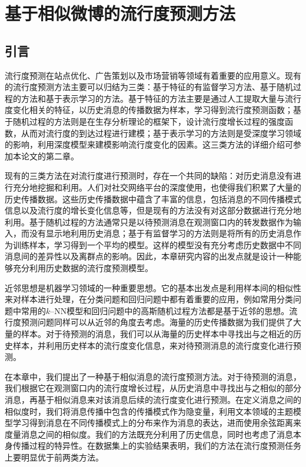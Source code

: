 \chapter{基于相似微博的流行度预测方法}
\label{chap:three}
\section{引言}
流行度预测在站点优化、广告策划以及市场营销等领域有着重要的应用意义。现有的流行度预测方法主要可以归结为三类：基于特征的有监督学习方法、基于随机过程的方法和基于表示学习的方法。基于特征的方法主要是通过人工提取大量与流行度变化相关的特征，以历史消息的传播数据为样本，学习得到流行度预测函数；基于随机过程的方法则是在生存分析理论的框架下，设计流行度增长过程的强度函数，从而对流行度的到达过程进行建模；基于表示学习的方法则是受深度学习领域的影响，利用深度模型来建模影响流行度变化的因素。这三类方法的详细介绍可参加本论文的第二章。

现有的三类方法在对流行度进行预测时，存在一个共同的缺陷：对历史消息没有进行充分地挖掘和利用。人们对社交网络平台的深度使用，也使得我们积累了大量的历史传播数据。这些历史传播数据中蕴含了丰富的信息，包括消息的不同传播模式信息以及流行度的增长变化信息等，但是现有的方法没有对这部分数据进行充分地利用。基于随机过程的方法通常只是以待预测消息在观测窗口内的转发数据作为输入，而没有显示地利用历史消息；基于有监督学习的方法则是将所有的历史消息作为训练样本，学习得到一个平均的模型。这样的模型没有充分考虑历史数据中不同消息间的差异性以及离群点的影响。因此，本章研究内容的出发点就是设计一种能够充分利用历史数据的流行度预测模型。

近邻思想是机器学习领域的一种重要思想。它的基本出发点是利用样本间的相似性来对样本进行处理，在分类问题和回归问题中都有着重要的应用，例如常用分类问题中常用的$k$--NN模型\citep{keller1985fuzzy}和回归问题中的高斯随机过程方法\citep{williams1996gaussian}都是基于近邻的思想。流行度预测问题同样可以从近邻的角度去考虑。海量的历史传播数据为我们提供了大量的样本。对于待预测的消息，我们可以从海量的历史样本中寻找出与之相近的历史样本，并利用历史样本的流行度变化信息，来对待预测消息的流行度变化进行预测。

 在本章中，我们提出了一种基于相似消息的流行度预测方法。对于待预测的消息，我们根据它在观测窗口内的流行度增长过程，从历史消息中寻找出与之相似的部分消息，再基于相似消息来对该消息后续的流行度变化进行预测。在定义消息之间的相似度时，我们将消息传播中包含的传播模式作为隐变量，利用文本领域的主题模型\citep{blei2003latent}学习得到消息在不同传播模式上的分布来作为消息的表达，进而使用余弦距离来度量消息之间的相似度。我们的方法既充分利用了历史信息，同时也考虑了消息本身传播过程的特异性。在数据集上的实验结果表明，我们的方法在流行度预测任务上要明显优于前两类方法。

